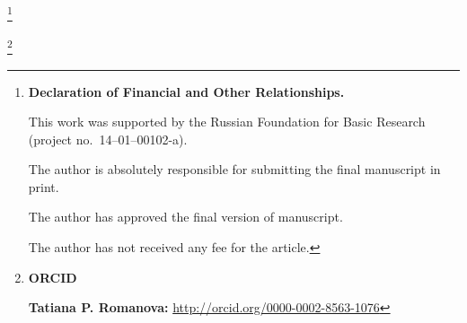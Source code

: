 \makeentitle





\thanks{{\bf Declaration of Financial and Other Relationships.}

This work was supported by the Russian Foundation for Basic Research (project no.~14--01--00102-a).

The author is absolutely responsible for submitting the final manuscript in print.

The author has approved the final version of manuscript.

The author has not received any fee for the article.

}





\thanks{{\bf ORCID}



{\bf  Tatiana P. Romanova:}    \url{http://orcid.org/0000-0002-8563-1076}



}





\EngRef

